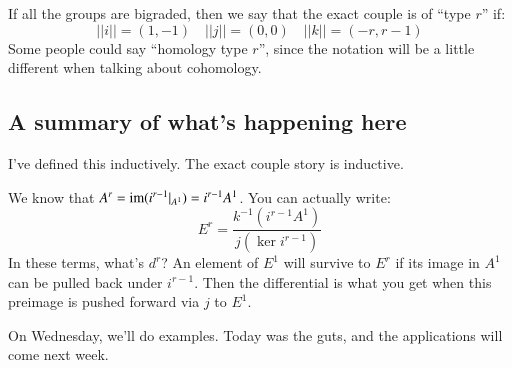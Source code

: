 If all the groups are bigraded, then we say that the exact couple is of ``type $r$'' if:
$$
||i|| = (1,-1)\quad ||j|| = (0,0) \quad ||k|| = (-r,r-1)
$$
Some people could say ``homology type $r$'', since the notation will be a little different when talking about cohomology.

\subsection{A summary of what's happening here}
I've defined this inductively.
The exact couple story is inductive.

We know that $A^r = \operatorname{im}(i^{r-1}|_{A^1}) = i^{r-1} A^1$.
You can actually write:
$$
E^r = \frac{k^{-1}(i^{r-1}A^1)}{j(\ker i^{r-1})}
$$
In these terms, what's $d^r$?
An element of $E^1$ will survive to $E^r$ if its image in $A^1$ can be pulled back under $i^{r-1}$.
Then the differential is what you get when this preimage is pushed forward via $j$ to $E^1$.

On Wednesday, we'll do examples.
Today was the guts, and the applications will come next week.
